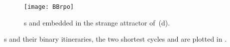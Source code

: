 
\begin{figure}%
  \begin{center}
  \texttt{[image: BBrpo]}
  \end{center}
  \caption{
	\Rpo s  and  embedded in the strange attractor
    of \,(d).
    }
  \label{fig:BBrpo1-01}
\end{figure}

\rpo s and their binary itineraries, the two shortest cycles
 and  are plotted in
.
